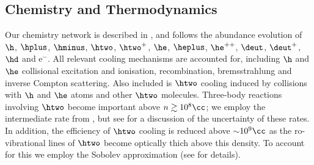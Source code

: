 \subsection{Chemistry and Thermodynamics}
\label{chemistry}
 Our chemistry network is described in \citet{Greifetal2009b}, and follows the abundance evolution of $\h$, $\hplus$, $\hminus$, $\htwo$, $\htwo^+$, $\he$, $\heplus$, $\he^{++}$, $\deut$, $\deut^+$, $\hd$ and e$^-$. All relevant cooling mechanisms are accounted for, including $\h$ and $\he$ collisional excitation and ionisation, recombination, bremsstrahlung and inverse Compton scattering. Also included is $\htwo$ cooling induced by collisions with $\h$ and $\he$ atoms and other $\htwo$ molecules.  Three-body reactions involving $\htwo$ become important above $n \gtrsim 10^8\cc$; we employ the intermediate rate from \citet{PallaSalpeterStahler1983}, but see \citet{Turketal2011} for a discussion of the uncertainty of these rates.
In addition, the efficiency of $\htwo$ cooling is reduced above $\sim$$10^9\cc$ as the ro-vibrational lines of $\htwo$ become optically thich above this density.  To account for this we employ the Sobolev approximation (see \citealt{Yoshidaetal2006, Greifetal2011} for details). 